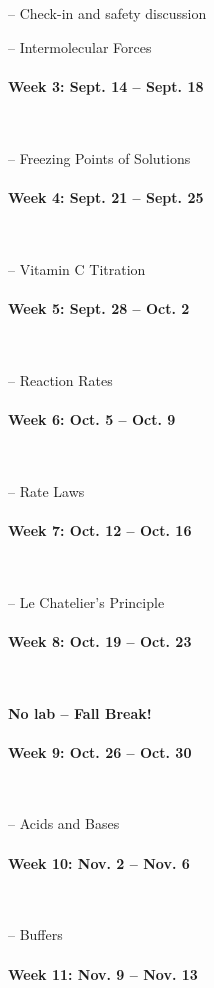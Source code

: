 \documentclass[12pt, letterpaper]{article}
\begin{document}
-- Check-in and safety discussion

-- Intermolecular Forces

\paragraph{Week 3: Sept. 14 -- Sept. 18}~

-- Freezing Points of Solutions

\paragraph{Week 4: Sept. 21 -- Sept. 25}~

-- Vitamin C Titration

\paragraph{Week 5: Sept. 28 -- Oct. 2}~

-- Reaction Rates

\paragraph{Week 6: Oct. 5 -- Oct. 9}~

-- Rate Laws

\paragraph{Week 7: Oct. 12 -- Oct. 16}~

-- Le Chatelier's Principle

\paragraph{Week 8: Oct. 19 -- Oct. 23}~

\textbf{No lab -- Fall Break!}

\paragraph{Week 9: Oct. 26 -- Oct. 30}~

-- Acids and Bases

\paragraph{Week 10: Nov. 2 -- Nov. 6}~

-- Buffers

\paragraph{Week 11: Nov. 9 -- Nov. 13}~
\end{document}
